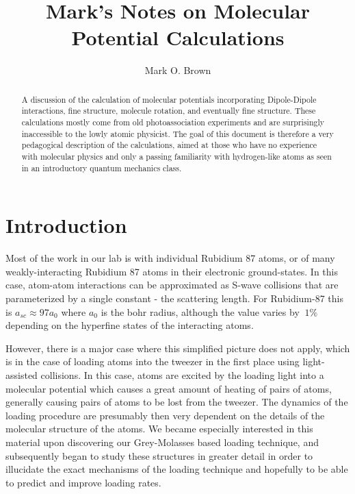 \documentclass[prl, longbibliography]{revtex4-2}
\begin{document}
\title{Mark's Notes on Molecular Potential Calculations}
\author{Mark O. Brown}

\begin{abstract}
A discussion of the calculation of molecular potentials incorporating Dipole-Dipole interactions, fine structure, molecule rotation, and eventually fine structure. These calculations mostly come from old photoassociation experiments and are surprisingly inaccessible to the lowly atomic physicist. The goal of this document is therefore a very pedagogical description of the calculations, aimed at those who have no experience with molecular physics and only a passing familiarity with hydrogen-like atoms as seen in an introductory quantum mechanics class. 
\end{abstract}

\maketitle

\section{Introduction}
Most of the work in our lab is with individual Rubidium 87 atoms, or of many weakly-interacting Rubidium 87 atoms in their electronic ground-states. 
In this case, atom-atom interactions can be approximated as S-wave collisions that are parameterized by a single constant - the scattering length. 
For Rubidium-87 this is $a_{sc}\approx97 a_0$ where $a_0$ is the bohr radius, although the value varies by $~1\%$ depending on the hyperfine states of the interacting atoms\cite{egorov_precision_2013}. 

However, there is a major case where this simplified picture does not apply, which is in the case of loading atoms into the tweezer in the first place using light-assisted collisions. In this case, atoms are excited by the loading light into a molecular potential which causes a great amount of heating of pairs of atoms, generally causing pairs of atoms to be lost from the tweezer. The dynamics of the loading procedure are presumably then very dependent on the details of the molecular structure of the atoms. We became especially interested in this material upon discovering our Grey-Molasses based loading technique, and subsequently began to study these structures in greater detail in order to illucidate the exact mechanisms of the loading technique and hopefully to be able to predict and improve loading rates. 
\end{document}
